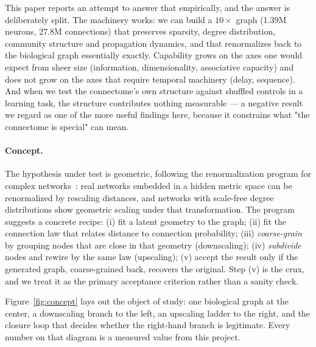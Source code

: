 \documentclass[11pt,a4paper]{article}
\begin{document}
This paper reports an attempt to answer that empirically, and the answer is deliberately split.
The machinery works: we can build a $10\times$ graph (1.39M neurons, 27.8M connections) that
preserves sparsity, degree distribution, community structure and propagation dynamics, and that
renormalizes back to the biological graph essentially exactly. Capability grows on the axes one
would expect from sheer size (information, dimensionality, associative capacity) and does not
grow on the axes that require temporal machinery (delay, sequence). And when we test the
connectome's own structure against shuffled controls in a learning task, the structure
contributes nothing measurable --- a negative result we regard as one of the more useful
findings here, because it constrains what "the connectome is special" can mean.

\paragraph{Concept.} The hypothesis under test is geometric, following the renormalization
program for complex networks~\cite{geom-renorm}: real networks embedded in a hidden metric
space can be renormalized by rescaling distances, and networks with scale-free degree
distributions show geometric scaling under that transformation. The program suggests a
concrete recipe: (i) fit a latent geometry to the graph; (ii) fit the connection law that
relates distance to connection probability; (iii) \emph{coarse-grain} by grouping nodes that are
close in that geometry (downscaling); (iv) \emph{subdivide} nodes and rewire by the same law
(upscaling); (v) accept the result only if the generated graph, coarse-grained back, recovers the
original. Step (v) is the crux, and we treat it as the primary acceptance criterion rather than a
sanity check.

Figure~\ref{fig:concept} lays out the object of study: one biological graph at the center, a
downscaling branch to the left, an upscaling ladder to the right, and the closure loop that
decides whether the right-hand branch is legitimate. Every number on that diagram is a measured
value from this project.
\end{document}
